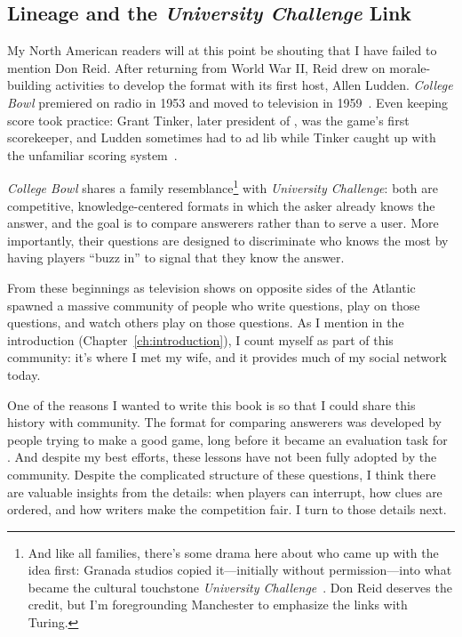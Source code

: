 \label{sec:manchester:qb}

\subsection{\quizbowl{} Lineage and the \textit{University Challenge} Link}
\label{sec:manchester:qb-lineage}

My North American readers will at this point be shouting that I have
failed to mention Don Reid.
%
After returning from World War II, Reid drew on 
morale-building activities to develop the format with its first host,
Allen Ludden.  \textit{College Bowl} premiered on radio in 1953 and
moved to television in 1959~\citep{baber-15}.
%
Even keeping score took practice: Grant Tinker, later president of
, was the game's first scorekeeper, and Ludden sometimes had
to ad lib while Tinker caught up with the unfamiliar scoring
system~\citep{baber-15}.

\textit{College Bowl} shares a family resemblance\footnote{And like all families, there's
  some drama here about who came up with the idea first: Granada studios copied
  it---initially without permission---into what became the 
  cultural touchstone \textit{University
      Challenge}~\citep{taylor_mcnulty_meek}.  Don Reid deserves the credit, but I'm foregrounding Manchester to
  emphasize the links with Turing.} with \textit{University
  Challenge}: both are competitive, knowledge-centered formats in
which the asker already knows the answer, and the goal is to compare
answerers rather than to serve a user. More importantly, their
questions are designed to discriminate who knows the most by having
players ``buzz in'' to signal that they know the answer.

From these beginnings as television shows on opposite sides of the
Atlantic spawned a massive community of people who write questions,
play on those questions, and watch others play on those questions.
%
As I mention in the introduction (Chapter~\ref{ch:introduction}), I
count myself as part of this community: it's where I met my wife, and
it provides much of my social network today.

One of the reasons I wanted to write this book is so that I could share this history with  community.
%
The format for comparing answerers was
developed by people trying to make a good game, long before it became
an evaluation task for .
%
And despite my best efforts, these lessons have not been fully adopted by the  community.
%
Despite the complicated structure of these questions, I think there
are valuable insights from the details: when players can interrupt,
how clues are ordered, and how writers make the competition fair.  I
turn to those details next.

